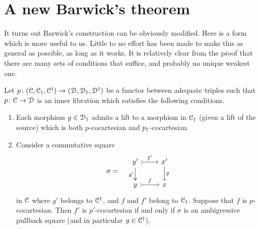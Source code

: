 \documentclass[main.tex]{subfiles}
\begin{document}
\section{A new Barwick's theorem}
\label{sec:a_new_barwick_s_theorem}

It turns out Barwick's construction can be obviously modified. Here is a form which is more useful to us. Little to no effort has been made to make this as general as possible, as long as it works. It is relatively clear from the proof that there are many sets of conditions that suffice, and probably no unique weakest one.

\begin{theorem}
  \label{thm:old_barwick}
  Let $p\colon (\mathcal{C}, \mathcal{C}_{\dagger}, \mathcal{C}^{\dagger}) \to (\mathcal{D}, \mathcal{D}_{\dagger}, \mathcal{D}^{\dagger})$ be a functor between adequate triples such that $p\colon \mathcal{C} \to \mathcal{D}$ is an inner fibration which satisfies the following conditions.
  \begin{enumerate}
    \item Each morphism $g \in \mathcal{D}_{\dagger}$ admits a lift to a morphism in $\mathcal{C}_{\dagger}$ (given a lift of the source) which is both $p$-cocartesian and $p_{\dagger}$-cocartesian.

    \item Consider a commutative square
      \begin{equation*}
        \sigma = \quad
        \begin{tikzcd}
          y'
          \arrow[r, rightarrowtail, "f'"]
          \arrow[d, two heads, swap, "g'"]
          & x'
          \arrow[d, "g"]
          \\
          y
          \arrow[r, rightarrowtail, "f"]
          & x
        \end{tikzcd}
      \end{equation*}
      in $\mathcal{C}$ where $g'$ belongs to $\mathcal{C}^{\dagger}$, and $f$ and $f'$ belong to $\mathcal{C}_{\dagger}$. Suppose that $f$ is $p$-cocartesian. Then $f'$ is $p'$-cocartesian if and only if $\sigma$ is an ambigressive pullback square (and in particular $g \in \mathcal{C}^{\dagger}$).
  \end{enumerate}
\end{theorem}
\end{document}
